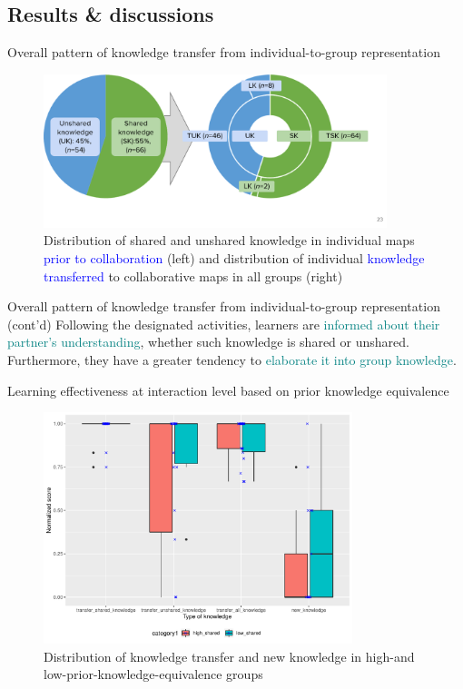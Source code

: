 \subsection{Results \& discussions}
\begin{frame}{Overall pattern of knowledge transfer from individual-to-group representation}
    \begin{figure}[tb]
     \begin{center}
      \includegraphics[width=100mm]{images/rqb_overall_transfer.png}
      \end{center}
      \caption{Distribution  of  shared  and  unshared  knowledge  in  individual maps \textcolor{blue}{prior to collaboration} (left) and distribution of individual \textcolor{blue}{knowledge transferred} to collaborative maps in all groups (right)}
      \label{rqb::result_dist}  
    \end{figure}
\end{frame}

\begin{frame}{Overall pattern of knowledge transfer from individual-to-group representation (cont'd)}
    Following the designated activities, learners are \textcolor{teal}{informed about their partner's understanding}, whether such knowledge is shared or unshared. Furthermore, they have a greater tendency to \textcolor{teal}{elaborate it into group knowledge}.
\end{frame}

\begin{frame}{Learning effectiveness at interaction level based on prior knowledge equivalence}
    \begin{figure}[tb]
     \begin{center}
      \includegraphics[width=90mm]{images/rqb_dist-shared-all-redraw.pdf}
      \end{center}
      \caption{Distribution of knowledge transfer and new knowledge in high-and  low-prior-knowledge-equivalence  groups}
      \label{rqb::dist_equival}  
    \end{figure}

\end{frame}
    
